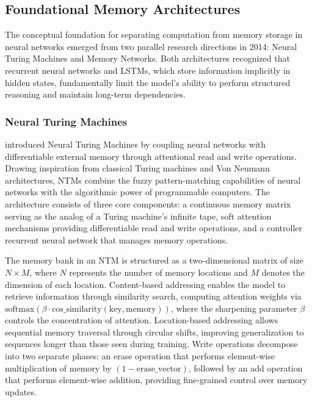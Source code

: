 \documentclass[11pt,letterpaper]{article}
\begin{document}
\subsection{Foundational Memory Architectures}

The conceptual foundation for separating computation from memory storage in neural networks emerged from two parallel research directions in 2014: Neural Turing Machines and Memory Networks. Both architectures recognized that recurrent neural networks and LSTMs, which store information implicitly in hidden states, fundamentally limit the model's ability to perform structured reasoning and maintain long-term dependencies.

\subsubsection{Neural Turing Machines}

\cite{graves2014neural} introduced Neural Turing Machines by coupling neural networks with differentiable external memory through attentional read and write operations. Drawing inspiration from classical Turing machines and Von Neumann architectures, NTMs combine the fuzzy pattern-matching capabilities of neural networks with the algorithmic power of programmable computers. The architecture consists of three core components: a continuous memory matrix serving as the analog of a Turing machine's infinite tape, soft attention mechanisms providing differentiable read and write operations, and a controller recurrent neural network that manages memory operations.

The memory bank in an NTM is structured as a two-dimensional matrix of size $N \times M$, where $N$ represents the number of memory locations and $M$ denotes the dimension of each location. Content-based addressing enables the model to retrieve information through similarity search, computing attention weights via $\text{softmax}(\beta \cdot \text{cos\_similarity}(\text{key}, \text{memory}))$, where the sharpening parameter $\beta$ controls the concentration of attention. Location-based addressing allows sequential memory traversal through circular shifts, improving generalization to sequences longer than those seen during training. Write operations decompose into two separate phases: an erase operation that performs element-wise multiplication of memory by $(1 - \text{erase\_vector})$, followed by an add operation that performs element-wise addition, providing fine-grained control over memory updates.
\end{document}
